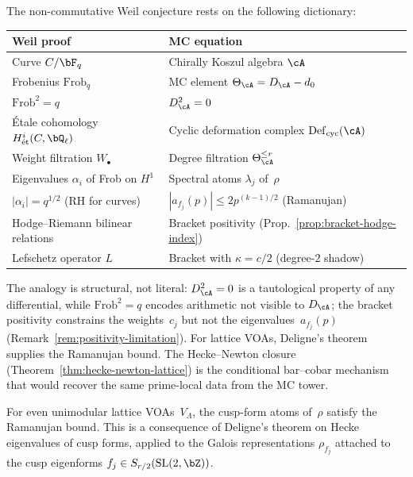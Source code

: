 \begin{remark}%
\label{rem:weil-analogy-table}%
%
The non-commutative Weil conjecture rests on the following dictionary:
\begin{center}
\small
\renewcommand{\arraystretch}{1.2}
\begin{tabular}{ll}
\toprule
\textbf{Weil proof} & \textbf{MC equation} \\
\midrule
Curve $C/\bF_q$
 & Chirally Koszul algebra $\cA$ \\
Frobenius $\mathrm{Frob}_q$
 & MC element $\Theta_\cA = D_\cA - d_0$ \\
$\mathrm{Frob}^2 = q$
 & $D_\cA^2 = 0$ \\
\'Etale cohomology $H^i_{\text{\'et}}(C,\bQ_\ell)$
 & Cyclic deformation complex $\mathrm{Def}_{\mathrm{cyc}}(\cA)$ \\
Weight filtration $W_\bullet$
 & Degree filtration $\Theta^{\le r}_\cA$ \\
Eigenvalues $\alpha_i$ of Frob on $H^1$
 & Spectral atoms $\lambda_j$ of~$\rho$ \\
$|\alpha_i| = q^{1/2}$ (RH for curves)
 & $|a_{f_j}(p)| \le 2p^{(k-1)/2}$ (Ramanujan) \\
Hodge--Riemann bilinear relations
 & Bracket positivity (Prop.~\ref{prop:bracket-hodge-index}) \\
Lefschetz operator $L$
 & Bracket with $\kappa = c/2$ (degree-$2$ shadow) \\
\bottomrule
\end{tabular}
\end{center}
The analogy is structural, not literal: $D_\cA^2 = 0$ is
a tautological property of any differential, while
$\mathrm{Frob}^2 = q$ encodes arithmetic not visible to $D_\cA$;
the bracket positivity constrains the weights~$c_j$ but not
the eigenvalues~$a_{f_j}(p)$
(Remark~\ref{rem:positivity-limitation}).
For lattice VOAs, Deligne's theorem supplies the Ramanujan bound.
The Hecke--Newton closure
(Theorem~\ref{thm:hecke-newton-lattice}) is the conditional
bar--cobar mechanism that would recover the same prime-local data
from the MC tower.
\end{remark}

\begin{proposition}%
\label{prop:lattice-ramanujan}%
\ClaimStatusProvedHere%
%
%
For even unimodular lattice VOAs~$V_\Lambda$, the cusp-form atoms
of~$\rho$ satisfy the Ramanujan bound. This is a consequence of
Deligne's theorem on Hecke eigenvalues of cusp forms, applied to the
Galois representations
$\rho_{f_j}$ attached to the cusp eigenforms
$f_j \in S_{r/2}(\mathrm{SL}(2,\bZ))$.
\end{proposition}

